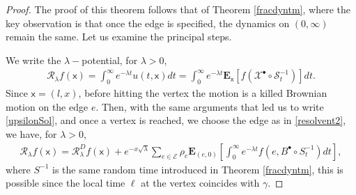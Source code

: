\documentclass[10pt,a4paper]{amsart}
\begin{document}
		\begin{proof}
			The proof of this theorem follows that of Theorem \ref{fracdyntm}, where the key observation is that once the edge is specified, the dynamics on $(0,\infty)$ remain the same. Let us examine the principal steps.
			
			We write the $\lambda-$potential, for $\lambda >0$,
			\begin{align*}
				\mathcal{R}_\lambda f(\mathsf{x})=\int_{0}^{\infty} e^{-\lambda t} u(t,\mathsf{x}) dt =\int_{0}^{\infty} e^{-\lambda t} \mathbf{E}_\mathsf{x}[f(\mathcal{X}^\bullet \circ \mathcal{S}^{-1}_t)] dt.
			\end{align*}
			Since $\mathsf{x}=(l,x)$, before hitting the vertex the motion is a killed Brownian motion on the edge $e$. Then, with the same arguments that led us to write \eqref{upsilonSol},  and once a vertex is reached, we choose the edge as in \eqref{resolvent2}, we have, for $\lambda>0$,
			\begin{align}
				\label{resolvent-graph}
				\mathcal{R}_\lambda f(\mathsf{x})=\mathcal{R}_\lambda^D f(\mathsf{x})+ e^{-x \sqrt{\lambda}}  \sum_{e \in \mathcal{E}} \rho_e \mathbf{E}_{(e,0)}  \left[\int_0^\infty e^{-\lambda t} f(e, B^\bullet\circ {S}^{-1}_t) dt\right],
			\end{align}
			where ${S}^{-1}$ is the same random time introduced in Theorem \ref{fracdyntm}, this is possible since the local time $\ell$ at the vertex coincides with $\gamma$.
			

\end{proof}
\end{document}

